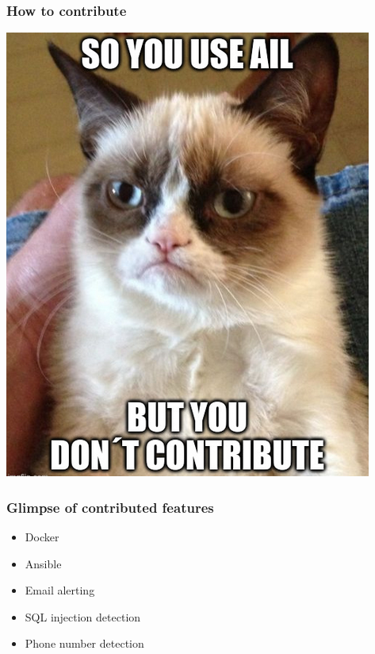 \documentclass[aspectratio=169]{beamer}
\begin{document}
\begin{frame}
\frametitle{How to contribute}
    \centerline{\includegraphics[scale=0.33]{images/cat.png}}
\end{frame}

\begin{frame}
    \frametitle{Glimpse of contributed features}
    \begin{itemize}
        \item Docker
        \item Ansible
        \item Email alerting
        \item SQL injection detection
        \item Phone number detection
    \end{itemize}
\end{frame}
\end{document}
